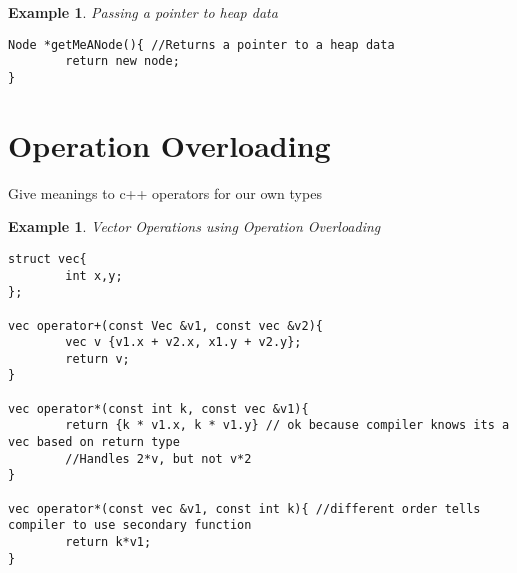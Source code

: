 \documentclass{article}
\newtheorem{ex}[theorem]{Example}
\begin{document}
\begin{ex} Passing a pointer to heap data
\begin{lstlisting}
Node *getMeANode(){ //Returns a pointer to a heap data
		return new node;
}
\end{lstlisting}
\end{ex}

\section{Operation Overloading}
Give meanings to c++ operators for our own types 

\begin{ex} Vector Operations using Operation Overloading
\begin{lstlisting}
struct vec{
		int x,y;
};

vec operator+(const Vec &v1, const vec &v2){
		vec v {v1.x + v2.x, x1.y + v2.y};
		return v;
}

vec operator*(const int k, const vec &v1){
		return {k * v1.x, k * v1.y} // ok because compiler knows its a vec based on return type
		//Handles 2*v, but not v*2
}

vec operator*(const vec &v1, const int k){ //different order tells compiler to use secondary function
		return k*v1;
}
\end{lstlisting}
\end{ex}
\end{document}
